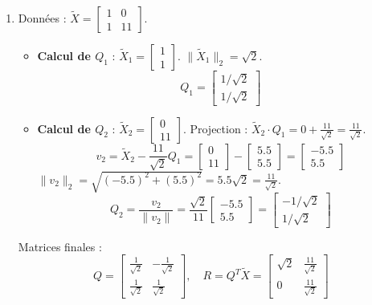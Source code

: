 \documentclass[solutions]{../exercices}
\begin{document}
\begin{solution}
\begin{enumerate}
        \item Données : $\tilde{X} = \begin{bmatrix} 1 & 0 \\ 1 & 11 \end{bmatrix}$.
        \begin{itemize}
            \item \textbf{Calcul de $Q_1$} : $\tilde{X}_1 = \begin{bmatrix} 1 \\ 1 \end{bmatrix}$. $\|\tilde{X}_1\|_2 = \sqrt{2}$.
            \[ Q_1 = \begin{bmatrix} 1/\sqrt{2} \\ 1/\sqrt{2} \end{bmatrix} \]
            \item \textbf{Calcul de $Q_2$} : $\tilde{X}_2 = \begin{bmatrix} 0 \\ 11 \end{bmatrix}$.
            Projection : $\tilde{X}_2 \cdot Q_1 = 0 + \frac{11}{\sqrt{2}} = \frac{11}{\sqrt{2}}$.
            \[ v_2 = \tilde{X}_2 - \frac{11}{\sqrt{2}} Q_1 = \begin{bmatrix} 0 \\ 11 \end{bmatrix} - \begin{bmatrix} 5.5 \\ 5.5 \end{bmatrix} = \begin{bmatrix} -5.5 \\ 5.5 \end{bmatrix} \]
            $\|v_2\|_2 = \sqrt{(-5.5)^2 + (5.5)^2} = 5.5\sqrt{2} = \frac{11}{\sqrt{2}}$.
            \[ Q_2 = \frac{v_2}{\|v_2\|} = \frac{\sqrt{2}}{11} \begin{bmatrix} -5.5 \\ 5.5 \end{bmatrix} = \begin{bmatrix} -1/\sqrt{2} \\ 1/\sqrt{2} \end{bmatrix} \]
        \end{itemize}
        Matrices finales :
        \[
            Q = \begin{bmatrix} \frac{1}{\sqrt{2}} & -\frac{1}{\sqrt{2}} \\ \frac{1}{\sqrt{2}} & \frac{1}{\sqrt{2}} \end{bmatrix}, \quad
            R = Q^T \tilde{X} = \begin{bmatrix} \sqrt{2} & \frac{11}{\sqrt{2}} \\ 0 & \frac{11}{\sqrt{2}} \end{bmatrix}
        \]


\end{enumerate}
\end{solution}
\end{document}
